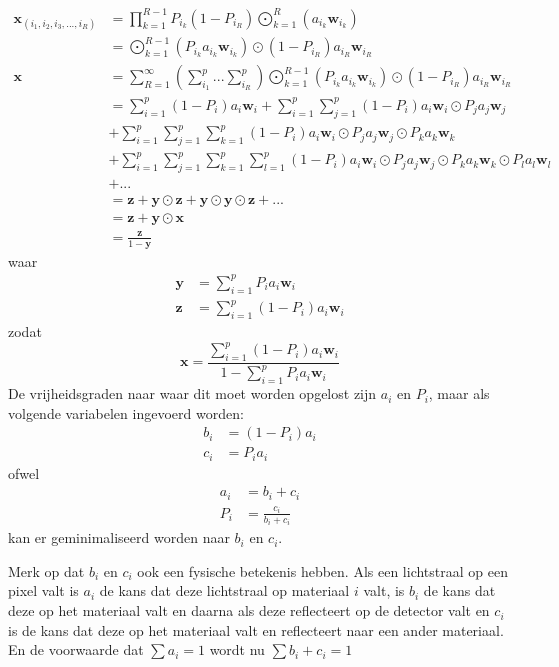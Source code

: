 \documentclass[12pt]{report}
\DeclareMathOperator*{\Odot}{\bigodot}
\begin{document}
\begin{align}
\bm{x}_{(i_1,i_2,i_3,...,i_R)} &= \prod_{k=1}^{R-1}P_{i_k} (1-P_{i_R}) \Odot_{k=1}^R \left(a_{i_k} \bm{w}_{i_k}\right) \\
&= \Odot_{k=1}^{R-1} \left(P_{i_k}a_{i_k} \bm{w}_{i_k}\right) \odot (1-P_{i_R}) a_{i_R} \bm{w}_{i_R} \\
\bm{x} &= \sum_{R=1}^{\infty} \left(\sum_{i_1}^{p} ... \sum_{i_R}^{p}\right) \Odot_{k=1}^{R-1} \left(P_{i_k}a_{i_k} \bm{w}_{i_k}\right) \odot (1-P_{i_R}) a_{i_R} \bm{w}_{i_R} \\
&= \sum_{i=1}^p (1-P_i) a_{i} \bm{w}_{i} + \sum_{i=1}^p \sum_{j=1}^p (1-P_i) a_{i} \bm{w}_{i} \odot P_j a_{j} \bm{w}_{j} \nonumber\\&+ \sum_{i=1}^p \sum_{j=1}^p \sum_{k=1}^p (1-P_i) a_{i} \bm{w}_{i} \odot P_j a_{j} \bm{w}_{j} \odot P_k a_{k} \bm{w}_{k} \nonumber\\&+ \sum_{i=1}^p \sum_{j=1}^p \sum_{k=1}^p  \sum_{l=1}^p (1-P_i) a_{i} \bm{w}_{i} \odot P_j a_{j} \bm{w}_{j} \odot P_k a_{k} \bm{w}_{k} \odot P_l a_{l} \bm{w}_{l} \nonumber \\& + ... \\
&= \bm{z} + \bm{y}\odot\bm{z} + \bm{y}\odot\bm{y}\odot\bm{z} + ... \\
&= \bm{z} + \bm{y}\odot\bm{x} \\
 &= \frac{\bm{z}}{1-\bm{y}}
\end{align}
waar
\begin{align}
\bm{y} &= \sum_{i=1}^p P_i a_{i} \bm{w}_{i} \\
\bm{z} &= \sum_{i=1}^p (1-P_i) a_{i} \bm{w}_{i} 
\end{align}
zodat
\begin{equation}
\bm{x} = \frac{\sum_{i=1}^p (1-P_i) a_{i} \bm{w}_{i}}{1-\sum_{i=1}^p P_i a_{i} \bm{w}_{i}} \label{eq:Pi}
\end{equation}
De vrijheidsgraden naar waar dit moet worden opgelost zijn $a_i$ en $P_i$, maar als volgende variabelen ingevoerd worden:
\begin{align}
b_i &= (1-P_i) a_i\\
c_i &= P_i a_i
\end{align}
ofwel 
\begin{align}
a_i &= b_i + c_i\\
P_i &= \frac{c_i}{b_i + c_i}
\end{align}
kan er geminimaliseerd worden naar $b_i$ en $c_i$.

Merk op dat $b_i$ en $c_i$ ook een fysische betekenis hebben. Als een lichtstraal op een pixel valt is
$a_i$ de kans dat deze lichtstraal op materiaal $i$ valt, is $b_i$ de kans dat deze op het materiaal valt en daarna als deze reflecteert op de detector valt en $c_i$ is de kans dat deze op het materiaal valt en reflecteert naar een ander materiaal. En de voorwaarde dat $\sum a_i = 1$ wordt nu $\sum b_i+c_i = 1$
\end{document}
